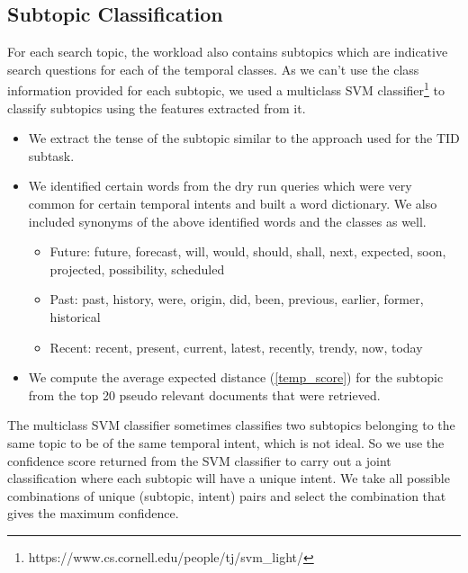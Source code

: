 \documentclass{sig-alternate}
\begin{document}
\subsection{Subtopic Classification}\label{subtopic_classify}
For each search topic, the workload also contains subtopics which are indicative search questions for each of the temporal classes. As we can't use the class information provided for each subtopic, we used a multiclass SVM classifier\footnote{https://www.cs.cornell.edu/people/tj/svm\_light/} to classify subtopics using the features extracted from it.
\begin{itemize}
\item We extract the tense of the subtopic similar to the approach used for the TID subtask. 
\item We identified certain words from the dry run queries which were very common for certain temporal intents and built a word dictionary. We also included synonyms of the above identified words and the classes as well.
\begin{itemize}
\item Future: future, forecast, will, would, should, shall, next, expected, soon, projected, possibility, scheduled
\item Past: past, history, were, origin, did, been, previous, earlier, former, historical
\item Recent: recent, present, current, latest, recently, trendy, now, today
\end{itemize}
\item We compute the average expected distance (\ref{temp_score}) for the subtopic from the top 20 pseudo relevant documents that were retrieved. 
\end{itemize}
The multiclass SVM classifier sometimes classifies two subtopics belonging to the same topic to be of the same temporal intent, which is not ideal. So we use the confidence score returned from the SVM classifier to carry out a joint classification where each subtopic will have a unique intent. We take all possible combinations of unique (subtopic, intent) pairs and select the combination that gives the maximum confidence.
\end{document}
